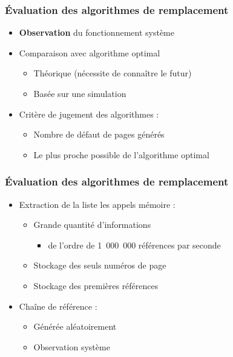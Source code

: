 \begin{frame}
\frametitle{Évaluation des algorithmes de remplacement}
\begin{itemize}
\item \textbf{Observation} du fonctionnement système
\item Comparaison avec algorithme optimal
\begin{itemize}
\item Théorique (nécessite de connaître le futur)
\item Basée sur une simulation
\end{itemize}
\item Critère de jugement des algorithmes :
\begin{itemize}
\item Nombre de défaut de pages générés
\item Le plus proche possible de l'algorithme optimal
\end{itemize}
\end{itemize}
\end{frame}


\begin{frame}
\frametitle{Évaluation des algorithmes de remplacement}
\begin{itemize}
\item Extraction de la liste les appels mémoire :
\begin{itemize}
\item Grande quantité d'informations
\begin{itemize}
\item de l'ordre de 1~000~000 références par seconde
\end{itemize}
\item Stockage des seuls numéros de page
\item Stockage des premières références
\end{itemize}
\item Chaîne de référence :
\begin{itemize}
\item Générée aléatoirement
\item Observation système
\end{itemize}
\end{itemize}
\end{frame}


